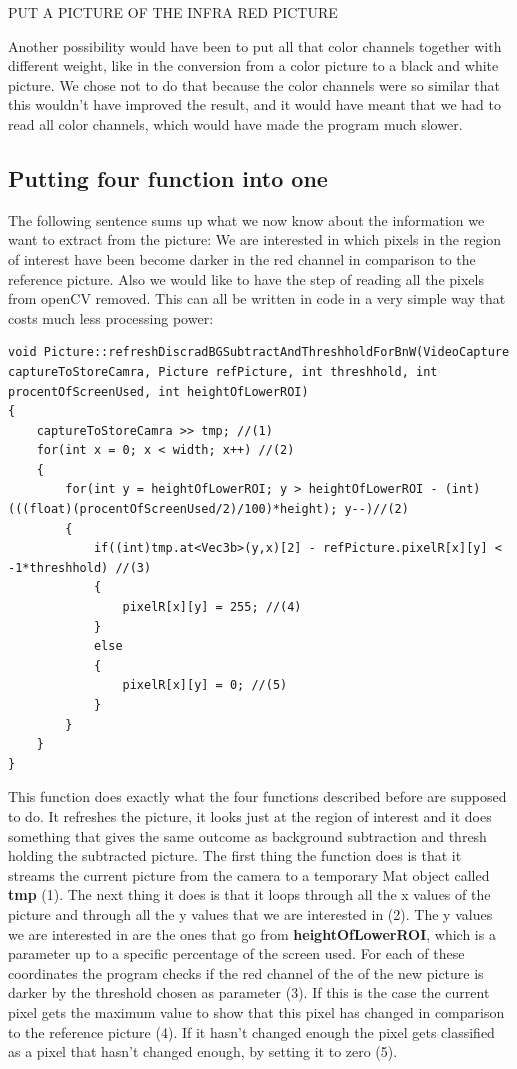 PUT A PICTURE OF THE INFRA RED PICTURE

Another possibility would have been to put all that color channels together with different weight, like in the conversion from a color picture to a black and white picture. We chose not to do that because the color channels were so similar that this wouldn't have improved the result, and it would have meant that we had to read all color channels, which would have made the program much slower. 

\subsection{Putting four function into one}
The following sentence sums up what we now  know about the information we want to extract from the picture: We are interested in which pixels in the region of interest have been become darker in the red channel in comparison to the reference picture. Also we would like to have the step of reading all the pixels from openCV removed. This can all be written in code in a very simple way that costs much less processing power:

\begin{lstlisting}
void Picture::refreshDiscradBGSubtractAndThreshholdForBnW(VideoCapture captureToStoreCamra, Picture refPicture, int threshhold, int procentOfScreenUsed, int heightOfLowerROI)
{
	captureToStoreCamra >> tmp; //(1)
	for(int x = 0; x < width; x++) //(2)
	{
		for(int y = heightOfLowerROI; y > heightOfLowerROI - (int)(((float)(procentOfScreenUsed/2)/100)*height); y--)//(2)
		{
			if((int)tmp.at<Vec3b>(y,x)[2] - refPicture.pixelR[x][y] < -1*threshhold) //(3)
			{
				pixelR[x][y] = 255; //(4)
			}
			else
			{
				pixelR[x][y] = 0; //(5)
			}
		}
	}
}
\end{lstlisting}
This function does exactly what the four functions described before are supposed to do. It refreshes the picture, it looks just at the region of interest and it does something that gives the same outcome as background subtraction and thresh holding the subtracted picture.
The first thing the function does is that it streams the current picture from the camera to a temporary Mat object called \textbf{tmp} (1). The next thing it does is that it loops through all the x values of the picture and through all the y values that we are interested in (2). The y values we are interested in are the ones that go from \textbf{heightOfLowerROI}, which is a parameter up to a specific percentage of the screen used. For each of these coordinates the program checks if the red channel of the of the new picture is darker by the threshold chosen as parameter (3). If this is the case the current pixel gets the maximum value to show that this pixel has changed in comparison to the reference picture (4). If it hasn't changed enough the pixel gets classified as a pixel that hasn't changed enough, by setting it to zero (5).

